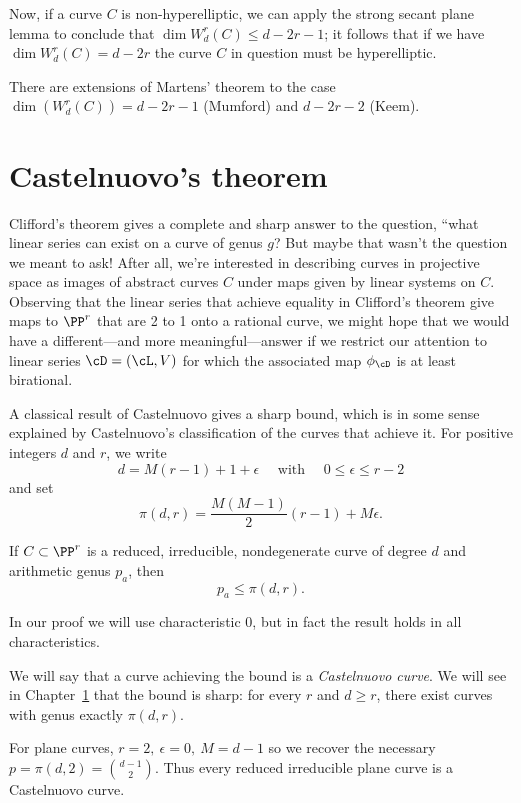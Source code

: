 Now, if a curve $C$ is non-hyperelliptic, we can apply the strong secant plane lemma to conclude that $\dim W^r_d(C) \leq d-2r-1$; it follows that if we have $\dim W^r_d(C) = d-2r$ the curve $C$ in question must be hyperelliptic.

There are extensions of Martens' theorem to the case $\dim(W^r_d(C)) = d-2r-1$ (Mumford) and $d-2r-2$ (Keem).



\section{Castelnuovo's theorem}

Clifford's theorem gives a complete and sharp answer to the question, ``what linear series can exist on a curve of genus $g$?
But maybe that wasn't the question we meant to ask! After all, we're interested in describing curves in projective space as images of abstract curves $C$ under maps given by linear systems on $C$. Observing that the linear series that achieve equality in Clifford's theorem give maps to $\PP^r$ that are 2 to 1 onto a rational curve, we might hope that we would have a different---and more meaningful---answer if we  restrict our attention to linear series $\cD = (\cL,V)$ for which the associated map $\phi_\cD$ is at least  birational. 

A classical result of Castelnuovo gives a sharp bound, which is in some sense explained by Castelnuovo's classification of the curves that achieve it. For positive integers $d$ and $r$, we write
$$
 d = M(r-1) + 1 + \epsilon \quad \text{ with } \quad 0 \leq \epsilon \leq r-2
$$
and set
$$
\pi(d,r) = \frac{M(M-1)}{2}(r-1) + M\epsilon.
$$

\begin{theorem}\label{Castelnuovo's bound}
If $C \subset \PP^r$ is a reduced, irreducible, nondegenerate curve of degree $d$ and arithmetic genus $p_a$, then
$$
p_a \leq \pi(d,r).
$$
\end{theorem}

In our proof we will use characteristic 0, but in fact the result holds in all characteristics.

We will say that a curve achieving the bound is a \emph{Castelnuovo curve}. We will see in Chapter~\ref{} that the bound is sharp: for every $r$ and $d \geq r$, there exist curves with genus exactly $\pi(d,r)$. 

\begin{example}
For plane curves, $r=2, \ \epsilon = 0, \ M = d-1$ so we recover the necessary $p = \pi(d,2) =  {d-1\choose 2}$. Thus every reduced irreducible
plane curve is a Castelnuovo curve.
\end{example}

